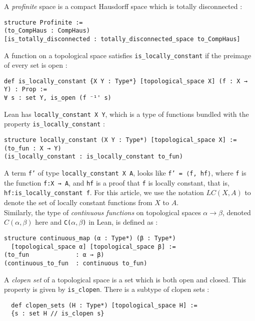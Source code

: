 \documentclass[a4paper,UKenglish,cleveref, autoref, thm-restate]{lipics-v2021}
\newcommand{\lean}[1]{\texttt{#1}\xspace} %
\begin{document}
A \textit{profinite} space is a compact Hausdorff space which is totally disconnected :
\begin{lstlisting}
structure Profinite :=
(to_CompHaus : CompHaus)
[is_totally_disconnected : totally_disconnected_space to_CompHaus]
\end{lstlisting}


A function on a topological space satisfies \lean{is\_locally\_constant} if the preimage of every set is open : 
\begin{lstlisting}
def is_locally_constant {X Y : Type*} [topological_space X] (f : X → Y) : Prop := 
∀ s : set Y, is_open (f ⁻¹' s)
\end{lstlisting} 

Lean has \lean{locally\_constant X Y}, which is a type of functions bundled with the property 
\newline \lean{is\_locally\_constant} :
\begin{lstlisting}
structure locally_constant (X Y : Type*) [topological_space X] :=
(to_fun : X → Y)
(is_locally_constant : is_locally_constant to_fun)
\end{lstlisting}
A term \lean{f'} of type \lean{locally\_constant X A}, looks like \lean{f' = ⟨f, hf⟩}, where 
\lean{f} is the function \lean{f:X → A}, and \lean{hf} is a proof that \lean{f} is locally constant, 
that is, \lean{hf:is\_locally\_constant f}. 
For this article, we use the notation $LC(X, A)$ to denote the set of locally constant functions 
from $X$ to $A$. \\

Similarly, the type of \textit{continuous functions} on topological spaces $\alpha \to \beta$, 
denoted $C(\alpha, \beta)$ here and \lean{C($\alpha, \beta$)} in Lean, is defined as :
\begin{lstlisting}
structure continuous_map (α : Type*) (β : Type*) 
  [topological_space α] [topological_space β] :=
(to_fun             : α → β)
(continuous_to_fun  : continuous to_fun)
\end{lstlisting}

A \textit{clopen set} of a topological space is a set which is both open and closed. This property is given by \lean{is\_clopen}. 
There is a subtype of clopen sets :
\begin{lstlisting}
  def clopen_sets (H : Type*) [topological_space H] := 
  {s : set H // is_clopen s}
\end{lstlisting}
\end{document}
